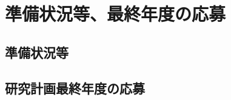 \documentclass[11pt,a4paper,twoside]{jarticle}
\newcommand{\研究種別}{A}	%
\newcommand{\研究課題名}{コ・クリエイティブなソフトウェア開発者を育成するPBL型教育}
\newcommand{\研究機関名}{産業技術大学院大学}
\newcommand{\研究代表者氏名}{中鉢　欣秀}
\newcommand{\研究代表者氏名ふりがな}{ちゅうばち　よしひで}
\newcommand{\本応募effort}{\KLEffort{18}}	%
\newcommand{\研究期間の最終元号年度}{27}	%
\begin{document}
\section{準備状況等、最終年度の応募}
\subsection{準備状況等}
\newcommand{\準備状況等}{%
	\underline{本研究を実施するための研究施設}としては，
	産業技術大学院大学（AIIT）では2006年度より情報システムのアーキテクトを育成するための
	PBLを実施しており（研究業績の\KLcite{pub:tozawa-pbl-2009}），本研究はこの一環として施設等を利用できる．
	また，このPBLにおいて，本研究者らはソフトウェア開発方法論を教育する目的で，
	反復型開発プロセスであるRUP（Rational Unified Process）や，XP（eXtreme Programming），チケット駆動開発などを
	指導した実績を有し，ここから得られた知見も活用する．
	特に，2009年度以降は，ベトナム国家大学の学生と共にグローバルPBLを展開し，
	海外の技術者との共同プロジェクトを実施し，その成果を発表している
	\KLcite{pub:kizaki-global-2011a}\KLcite{pub:kizaki-global-2011b}\KLcite{pub:kizaki-global-2011c}%
	\KLcite{pub:chubachi-global-2010}%
	\KLcite{pub:ohrui-global-2009}\KLcite{pub:tozawa-global-2009}．
	
	加えて，慶應義塾で開講している「協創型ソフトウェア開発」の授業を2011年度から担当し，今年度からは
	アジャイル型ソフトウェア開発手法であるScrumを全面的に導入し，コ・クリエイティブなソフトウェア開発者教育を始めたところである．

	\underline{本研究の研究成果を発信}するためには，AIITにおけるPBL全体を支援する情報インフラストラクチャに関する研究の成果
	\KLcite{pub:chubachi-ipbl-2012}\KLcite{pub:chubachi-ipbl-2011}%
	\KLcite{pub:chubachi-ipbl-2009a}\KLcite{pub:chubachi-ipbl-2009b}
	を活用する．
}

\subsection{研究計画最終年度の応募}
\newcommand{\研究計画最終年度の応募の研究種目名}{%
}

\newcommand{\研究計画最終年度の応募の審査区分}{%
}
\end{document}
